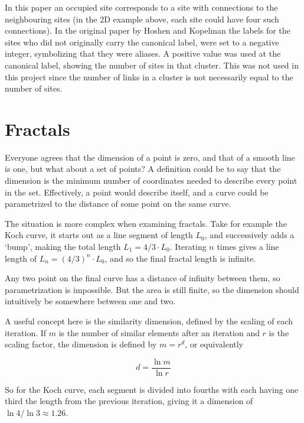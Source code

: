 In this paper an occupied site corresponds to a site with connections to the neighbouring sites (in the 2D example above, each site could have four such connections). In the original paper by Hoshen and Kopelman the labels for the sites who did not originally carry the canonical label, were set to a negative integer, symbolizing that they were aliases. A positive value was used at the canonical label, showing the number of sites in that cluster. This was not used in this project since the number of links in a cluster is not necessarily equal to the number of sites.

\section{Fractals}
\label{sec:fractals}

Everyone agrees that the dimension of a point is zero, and that of a smooth line is one, but what about a set of points? A definition could be to say that the dimension is the minimum number of coordinates needed to describe every point in the set. Effectively, a point would describe itself, and a curve could be parametrized to the distance of some point on the same curve.

The situation is more complex when examining fractals. Take for example the Koch curve, it starts out as a line segment of length $L_0$, and successively adds a `bump', making the total length $L_1 = 4/3 \cdot L_0$. Iterating $n$ times gives a line length of $L_n = {(4 / 3)}^n \cdot L_0$, and so the final fractal length is infinite.

Any two point on the final curve has a distance of infinity between them, so parametrization is impossible. But the area is still finite, so the dimension should intuitively be somewhere between one and two.

A useful concept here is the similarity dimension, defined by the scaling of each iteration. If $m$ is the number of similar elements after an iteration and $r$ is the scaling factor, the dimension is defined by $m = r^d$, or equivalently

\begin{equation}
	d = \frac{\ln m}{\ln r}
\end{equation}

So for the Koch curve, each segment is divided into fourths with each having one third the length from the previous iteration, giving it a dimension of $\ln 4 / \ln 3 \approx 1.26$.


